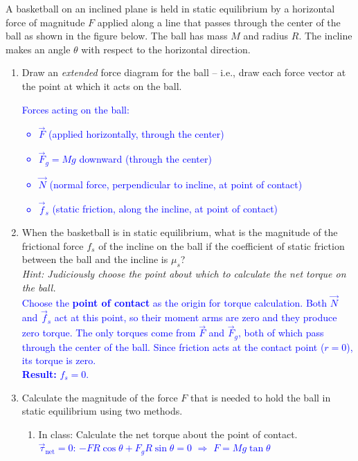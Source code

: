 \documentclass[11pt, letterpaper, openany]{book}
\newenvironment{exercise}[1][Exercise]{%
  \tcolorbox[blanker, breakable, left=1em,
    before skip=1em, after skip=1em,
    borderline west={3pt}{0pt}{PhysNavy},
    colback=PhysCream,
    before upper={\textcolor{PhysNavy}{\sffamily\bfseries #1:}\space}
  ]%
}{%
  \endtcolorbox%
}
\begin{document}
\begin{exercise}[Exercise 2]
A basketball on an inclined plane is held in static equilibrium by a horizontal force of magnitude $F$ applied along a line that passes through the center of the ball as shown in the figure below. The ball has mass $M$ and radius $R$. The incline makes an angle $\theta$ with respect to the horizontal direction.
\begin{enumerate}[label=(\alph*)]
    \item Draw an \textit{extended} force diagram for the ball -- i.e., draw each force vector at the point at which it acts on the ball. \\
    \textcolor{blue}{
    Forces acting on the ball:
    \begin{itemize}
        \item $\vec{F}$ (applied horizontally, through the center)
        \item $\vec{F}_g = Mg$ downward (through the center)
        \item $\vec{N}$ (normal force, perpendicular to incline, at point of contact)
        \item $\vec{f}_s$ (static friction, along the incline, at point of contact)
    \end{itemize}
    }
    
    \item When the basketball is in static equilibrium, what is the magnitude of the frictional force $f_s$ of the incline on the ball if the coefficient of static friction between the ball and the incline is $\mu_s$? \\
    \textit{Hint: Judiciously choose the point about which to calculate the net torque on the ball.} \\
    \textcolor{blue}{
    Choose the \textbf{point of contact} as the origin for torque calculation. Both $\vec{N}$ and $\vec{f}_s$ act at this point, so their moment arms are zero and they produce zero torque. The only torques come from $\vec{F}$ and $\vec{F}_g$, both of which pass through the center of the ball. Since friction acts at the contact point ($r=0$), its torque is zero. \\
    \textbf{Result:} $f_s = 0$.
    }
    
    \item Calculate the magnitude of the force $F$ that is needed to hold the ball in static equilibrium using two methods.
    \begin{enumerate}[label=(\Roman*)]
        \item In class: Calculate the net torque about the point of contact. \\
        \textcolor{blue}{
        $\vec{\tau}_{\text{net}} = 0$: \quad
        $-FR\cos\theta + F_g R\sin\theta = 0$ \quad $\Rightarrow$ \quad
        $\boxed{F = Mg\tan\theta}$
        }
        

\end{enumerate}
\end{enumerate}
\end{exercise}
\end{document}
